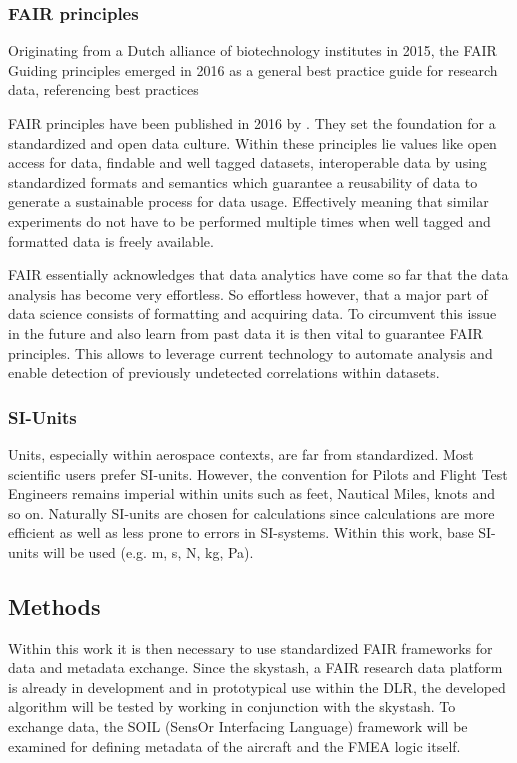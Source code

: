 \subsubsection{FAIR principles}

Originating from a Dutch alliance of biotechnology institutes in 2015, the FAIR Guiding principles emerged in 2016 as a general best practice guide for research data, referencing best practices

FAIR principles have been published in 2016 by \textcite{wilkinson_fair_2016}. They set the foundation for a standardized and open data culture. Within these principles lie values like open access for data, findable and well tagged datasets, interoperable data by using standardized formats and semantics which guarantee a reusability of data to generate a sustainable process for data usage. Effectively meaning that similar experiments do not have to be performed multiple times when well tagged and formatted data is freely available.


FAIR essentially acknowledges that data analytics have come so far that the data analysis has become very effortless. So effortless however, that a major part of data science consists of formatting and acquiring data. To circumvent this issue in the future and also learn from past data it is then vital to guarantee FAIR principles. This allows to leverage current technology to automate analysis and enable detection of previously undetected correlations within datasets.

\subsubsection{SI-Units}
Units, especially within aerospace contexts, are far from standardized. Most scientific users prefer SI-units. However, the convention for Pilots and Flight Test Engineers remains imperial within units such as feet, Nautical Miles, knots and so on. Naturally SI-units are chosen for calculations since calculations are more efficient as well as less prone to errors in SI-systems. Within this work, base SI-units will be used (e.g. m, s, N, kg, Pa).

\subsection{Methods}
Within this work it is then necessary to use standardized FAIR frameworks for data and metadata exchange. Since the skystash, a FAIR research data platform is already in development and in prototypical use within the DLR, the developed algorithm will be tested by working in conjunction with the skystash. To exchange data, the SOIL (SensOr Interfacing Language) framework will be examined for defining metadata of the aircraft and the FMEA logic itself.

